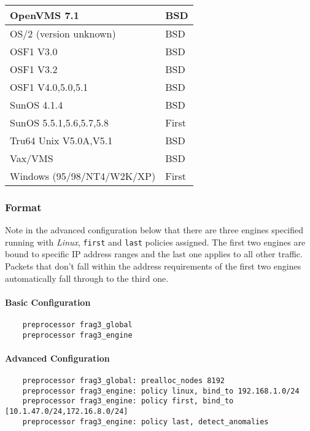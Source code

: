 \documentclass[english]{report}
\begin{document}
\begin{itemize}
\begin{itemize}
\begin{tabular}{| l | l |}
                        \hline
                  OpenVMS 7.1  & BSD \\
                        \hline
       OS/2 (version unknown)  & BSD \\
                        \hline
                    OSF1 V3.0  & BSD \\
                        \hline
                    OSF1 V3.2  & BSD \\
                        \hline
            OSF1 V4.0,5.0,5.1  & BSD \\
                        \hline
                  SunOS 4.1.4  & BSD \\
                        \hline
      SunOS 5.5.1,5.6,5.7,5.8  & First \\
                        \hline
        Tru64 Unix V5.0A,V5.1  & BSD \\
                        \hline
                      Vax/VMS  & BSD \\
                        \hline
   Windows (95/98/NT4/W2K/XP)  & First\\
\hline
\end{tabular}

\end{itemize}
\end{itemize}

\subsubsection{Format}

Note in the advanced configuration below that there are three engines specified
running with \emph{Linux}, \texttt{first} and \texttt{last} policies assigned.
The first two engines are bound to specific IP address ranges and the last one
applies to all other traffic.  Packets that don't fall within the address
requirements of the first two engines automatically fall through to the third
one.

\paragraph{Basic Configuration}
\begin{verbatim}
    preprocessor frag3_global
    preprocessor frag3_engine
\end{verbatim}

\paragraph{Advanced Configuration}
\begin{verbatim}
    preprocessor frag3_global: prealloc_nodes 8192 
    preprocessor frag3_engine: policy linux, bind_to 192.168.1.0/24
    preprocessor frag3_engine: policy first, bind_to [10.1.47.0/24,172.16.8.0/24]
    preprocessor frag3_engine: policy last, detect_anomalies
\end{verbatim}
\end{document}

